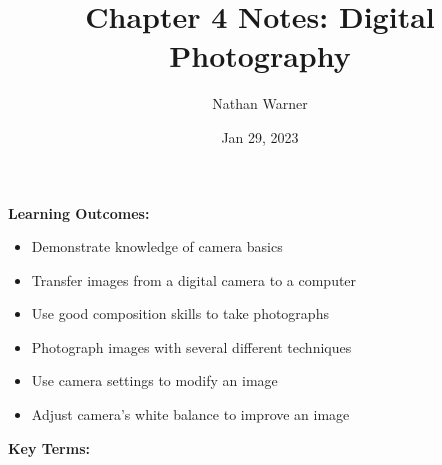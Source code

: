 \documentclass{report}
\title{\Huge{Chapter 4 Notes: Digital Photography}}
\author{\huge{Nathan Warner}}
\date{\huge{Jan 29, 2023}}
\begin{document}
    \maketitle
    \begin{Large}
        \noindent \textbf{Learning Outcomes:}
    \end{Large}

    \bigbreak \noindent 
    \begin{itemize}
        \item Demonstrate knowledge of camera basics
        \item Transfer images from a digital camera to a computer 
        \item Use good composition skills to take photographs
        \item Photograph images with several different techniques
        \item Use camera settings to modify an image
        \item Adjust camera’s white balance to improve an image 
    \end{itemize}

    \bigbreak \noindent \bigbreak \noindent 
    \begin{Large}
        \textbf{Key Terms:}
    \end{Large}
\end{document}
